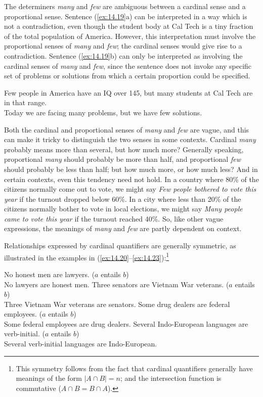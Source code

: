 {The determiners \textit{many} and \textit{few} are ambiguous between a cardinal sense and a proportional sense. Sentence (\ref{ex:14.19}a) can be interpreted in a way which is not a contradiction, even though the student body at Cal Tech is a tiny fraction of the total population of America. However, this interpretation must involve the proportional senses of \textit{many} and \textit{few}; the cardinal senses would give rise to a contradiction. Sentence (\ref{ex:14.19}b) can only be interpreted as involving the cardinal senses of \textit{many} and \textit{few}, since the sentence does not invoke any specific set of problems or solutions from which a certain proportion could be specified.


\ea \label{ex:14.19}
\ea Few people in America have an IQ over 145, but many students at Cal Tech are in that range.\\
\ex Today we are facing many problems, but we have few solutions.
     \z
\z


Both the cardinal and proportional senses of \textit{many} and \textit{few} are vague, and this can make it tricky to distinguish the two senses in some contexts. Cardinal \textit{many} probably means more than several, but how much more? Generally speaking, proportional \textit{many} should probably be more than half, and proportional \textit{few} should probably be less than half; but how much more, or how much less? And in certain contexts, even this tendency need not hold. In a country where 80\% of the citizens normally come out to vote, we might say \textit{Few people bothered to vote this year} if the turnout dropped below 60\%. In a city where less than 20\% of the citizens normally bother to vote in local elections, we might say \textit{Many people came to vote this year} if the turnout reached 40\%. So, like other vague expressions, the meanings of \textit{many} and \textit{few} are partly dependent on context.\largerpage

 
Relationships expressed by cardinal quantifiers are generally symmetric, as illustrated in the examples in (\ref{ex:14.20}--\ref{ex:14.23}):\footnote{This symmetry follows from the fact that cardinal quantifiers generally have meanings of the form $|A\cap B|=n$; and the intersection function is commutative ($A \cap  B = B \cap A$).}


\ea \label{ex:14.20}
\ea No honest men are lawyers. \hfill  ($a$ entails $b$)\\
\ex No lawyers are honest men.
 \z
\ex \label{ex:14.21}
\ea Three senators are Vietnam War veterans. \hfill  ($a$ entails $b$)\\
\ex Three Vietnam War veterans are senators.
\z 
\ex \label{ex:14.22}
\ea Some drug dealers are federal employees. \hfill  ($a$ entails $b$)\\
\ex Some federal employees are drug dealers.
\z 
\ex \label{ex:14.23}
\ea Several Indo-European languages are verb-initial. \hfill  ($a$ entails $b$)\\
\ex Several verb-initial languages are Indo-European.
\z
\z


}
